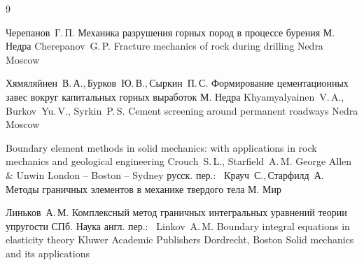 \begin{thebibliography}{9}

\by Черепанов~Г.\,П.
\book Механика разрушения горных пород в процессе бурения
\publaddr М.
\publ Недра
\misctransl
\by Cherepanov~G.\,P.
\book Fracture mechanics of rock during drilling 
\publ Nedra
\publaddr Moscow

\by Хямяляйнен~В.\,А.,\,Бурков~Ю.\,В.,\,Сыркин~П.\,С.
\book Формирование цементационных завес вокруг капитальных горных выработок
\publaddr М.
\publ Недра
\misctransl
\by Khyamyalyainen~V.\,A., Burkov~Yu.\,V., Syrkin~P.\,S.
\book Cement screening around permanent roadways 
\publ Nedra
\publaddr Moscow 

\book Boundary element methods in solid mechanics: with applications in rock mechanics and geological engineering
\by Crouch~S.\,L., Starfield~A.\,M.
\publ George Allen \& Unwin 
\publaddr London -- Boston -- Sydney
\rtransl русск. пер.:~
\by Крауч~С.,\,Старфилд~А.
\book Методы граничных элементов в механике твердого тела
\publaddr М.
\publ Мир

\by Линьков~А.\,М.
\book Комплексный метод граничных интегральных уравнений теории упругости
\publaddr СПб.
\publ Наука
\transl англ. пер.:~
\by Linkov~A.\,M.
\book Boundary integral equations in elasticity theory
\publ Kluwer Academic Publishers
\publaddr Dordrecht, Boston 
\serial Solid mechanics and its applications 


\end{thebibliography}



\makeengtitlem



 \newpage


%
